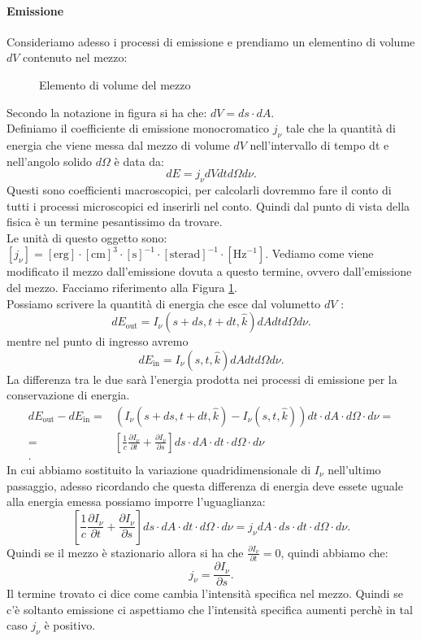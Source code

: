 \paragraph{Emissione}%
Consideriamo adesso i processi di emissione e prendiamo un elementino di volume $dV$ contenuto nel mezzo: 
\begin{figure}[H]
    \centering
    \caption{Elemento di volume del mezzo}
    \label{fig:elemento-di-volume-del-mezzo}
\end{figure}
\noindent
Secondo la notazione in figura si ha che: $dV = ds\cdot dA$.\\
Definiamo il coefficiente di emissione monocromatico $j _{\nu}$ tale che la quantità di energia che viene messa dal mezzo di volume $dV$ nell'intervallo di tempo dt e nell'angolo solido $d\Omega$ è data da:
\[
	dE = j _{\nu} dV dt d\Omega d\nu
.\] 
Questi sono coefficienti macroscopici, per calcolarli dovremmo fare il conto di tutti i processi microscopici ed inserirli nel conto. Quindi dal punto di vista della fisica è un termine pesantissimo da trovare.\\
Le unità di questo oggetto sono: $\left[ j _{\nu} \right] = \left[ \text{erg} \right] \cdot \left[ \text{cm} \right]^3 \cdot \left[ \text{s} \right]^{-1} \cdot \left[ \text{sterad} \right]^{-1} \cdot \left[ \text{Hz}^{-1} \right]$.
Vediamo come viene modificato il mezzo dall'emissione dovuta a questo termine, ovvero dall'emissione del mezzo. Facciamo riferimento alla Figura \ref{fig:elemento-di-volume-del-mezzo}.\\
Possiamo scrivere la quantità di energia che esce dal volumetto $dV$ :
\[
	dE_{\text{out}} = I_{\nu}\left( s+ds, t+dt, \hat{k} \right) dA dt d\Omega d\nu
.\] 
mentre nel punto di ingresso avremo
\[
	dE_{\text{in}} = I_{\nu}\left( s, t, \hat{k} \right) dA dt d\Omega d\nu
.\] 
La differenza tra le due sarà l'energia prodotta nei processi di emissione per la conservazione di energia.
\begin{align}
	dE_{\text{out}}- dE_{\text{in}} =& \left( I_{\nu}\left(s+ds,t+dt,\hat{k}\right)-I_{\nu}\left(s,t,\hat{k}\right)\right)dt\cdot dA\cdot d\Omega\cdot  d\nu = \\
	=& \left[ \frac{1}{c}\frac{\partial I_{\nu}}{\partial t} + \frac{\partial I_{\nu}}{\partial s}  \right] ds\cdot dA\cdot dt\cdot d\Omega\cdot  d\nu  \\
.\end{align}
In cui abbiamo sostituito la variazione quadridimensionale di $I_{\nu}$ nell'ultimo passaggio, adesso ricordando che questa differenza di energia deve essete uguale alla energia emessa possiamo imporre l'uguaglianza:
\[
	\left[ \frac{1}{c}\frac{\partial I_{\nu}}{\partial t} + \frac{\partial I_{\nu}}{\partial s}  \right] ds\cdot dA\cdot dt\cdot d\Omega\cdot  d\nu  = 
	j _{\nu} dA \cdot ds\cdot  dt\cdot  d\Omega\cdot  d\nu
.\] 
Quindi se il mezzo è stazionario allora si ha che $\frac{\partial I_{\nu}}{\partial t} = 0$, quindi abbiamo che:
\[
	j _{\nu}= \frac{\partial I_{\nu}}{\partial s} 
.\] 
Il termine trovato ci dice come cambia l'intensità specifica nel mezzo. Quindi se c'è soltanto emissione ci aspettiamo che l'intensità specifica aumenti perchè in tal caso $j_{\nu}$ è positivo.
